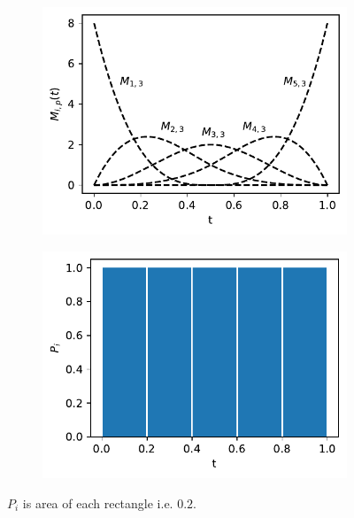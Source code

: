 \documentclass[../Thesis.tex]{subfiles}
\begin{document}
\begin{figure}[ht]
    \centering
    \begin{subfigure}[t]{0.49\textwidth}
        \centering
        \includegraphics[width=\linewidth]{figures/MI estimation/M-spline basis functions - degree 3.pdf}
        \caption{}
        \label{subfig:M-spline functions}
    \end{subfigure}
    \hfill
    \begin{subfigure}[t]{0.49\textwidth}
        \centering
        \includegraphics[width=\linewidth]{figures/MI estimation/M-spline marginal dist - degree 3.pdf}
        \caption{}
    \end{subfigure}
    \caption{$P_i$ is area of each rectangle i.e. $0.2$.}
    \label{fig:M-splines}
\end{figure}
\end{document}
